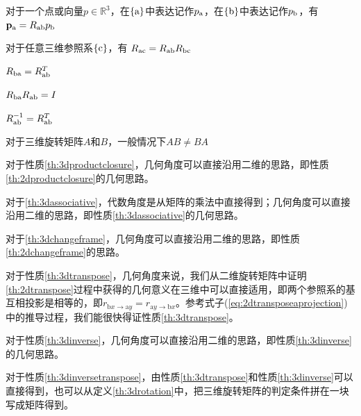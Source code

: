 \documentclass[12pt, a4paper, article, UTF8]{ctexart}
\begin{document}
\begin{mytheorem}
对于一个点或向量$p\in\mathbb{R}^3$，在$\{\textnormal{a}\}$中表达记作$p_\textnormal{a}$，在$\{\textnormal{b}\}$中表达记作$p_\textnormal{b}$，有$\mathbf{p}_\textnormal{a}=R_\textnormal{ab}p_\textnormal{b}$ \label{th:3dchangeframe}
\end{mytheorem}

\begin{mytheorem}
对于任意三维参照系$\{\textnormal{c}\}$，有
$R_\textnormal{ac} = R_\textnormal{ab}R_\textnormal{bc}$
\end{mytheorem}

\begin{mytheorem}
$R_\textnormal{ba} = R_\textnormal{ab}^T$  \label{th:3dtranspose}
\end{mytheorem}

\begin{mytheorem}
$R_\textnormal{ba} R_\textnormal{ab}=I$  \label{th:3dinverse}
\end{mytheorem}

\begin{mytheorem}
$R_\textnormal{ab}^{-1} = R_\textnormal{ab}^T$  \label{th:3dinversetranspose}
\end{mytheorem}

\begin{mytheorem}
对于三维旋转矩阵$A$和$B$，一般情况下$AB\neq BA$\label{th:3dcommutative}
\end{mytheorem}

对于性质\ref{th:3dproductclosure}，几何角度可以直接沿用二维的思路，即性质\ref{th:2dproductclosure}的几何思路。

对于\ref{th:3dassociative}，代数角度是从矩阵的乘法中直接得到；几何角度可以直接沿用二维的思路，即性质\ref{th:3dassociative}的几何思路。

对于\ref{th:3dchangeframe}，几何角度可以直接沿用二维的思路，即性质\ref{th:2dchangeframe}的思路。
 
对于性质\ref{th:3dtranspose}，几何角度来说，我们从二维旋转矩阵中证明\ref{th:2dtranspose}过程中获得的几何意义在三维中可以直接适用，即两个参照系的基互相投影是相等的，即$r_{\text{b}x\rightarrow\text{a}y} = r_{\text{a}y\rightarrow\text{b}x}$。参考式子(\ref{eq:2dtransposeaprojection})中的推导过程，我们能很快得证性质\ref{th:3dtranspose}。

对于性质\ref{th:3dinverse}，几何角度可以直接沿用二维的思路，即性质\ref{th:3dinverse}的几何思路。

对于性质\ref{th:3dinversetranspose}，由性质\ref{th:3dtranspose}和性质\ref{th:3dinverse}可以直接得到，也可以从定义\ref{th:3drotation}中，把三维旋转矩阵的判定条件拼在一块写成矩阵得到。
\end{document}
